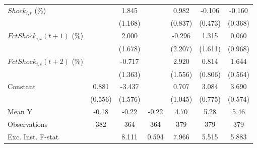 {\begin{tabular}{l*{6}{c}}
\addlinespace
$ Shock_{i,t}$ (\%) &                     &       1.845         &                     &       0.982         &      -0.106         &      -0.160         \\
                    &                     &     (1.168)         &                     &     (0.837)         &     (0.473)         &     (0.368)         \\
\addlinespace
$ FctShock_{i,t}(t+1)$ (\%)&                     &       2.000         &                     &      -0.296         &       1.315         &       0.060         \\
                    &                     &     (1.678)         &                     &     (2.207)         &     (1.611)         &     (0.968)         \\
\addlinespace
$ FctShock_{i,t}(t+2)$ (\%)&                     &      -0.717         &                     &       2.920\sym{*}  &       0.814         &       1.644\sym{***}\\
                    &                     &     (1.363)         &                     &     (1.556)         &     (0.806)         &     (0.564)         \\
\addlinespace
Constant            &       0.881         &      -3.437\sym{**} &                     &       0.707         &       3.084\sym{***}&       3.690\sym{***}\\
                    &     (0.556)         &     (1.576)         &                     &     (1.045)         &     (0.775)         &     (0.574)         \\
\midrule
Mean Y              &       -0.18         &       -0.22         &       -0.22         &        4.70         &        5.28         &        5.46         \\
Observations        &         382         &         364         &         364         &         379         &         379         &         379         \\
Exc. Inst. F-stat   &                     &       8.111         &       0.594         &       7.966         &       5.515         &       5.883         \\
\bottomrule
\end{tabular}
}
